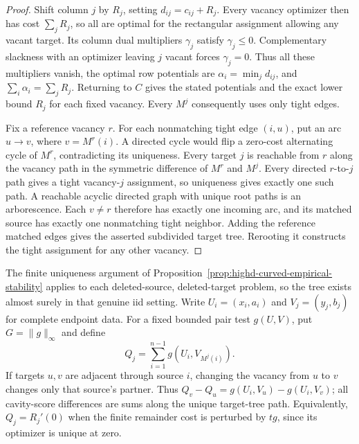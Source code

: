 \documentclass[11pt,reqno]{amsart}
\theoremstyle{definition}
\theoremstyle{remark}
\numberwithin{equation}{section}
\begin{document}
\begin{proof}
Shift column \(j\) by \(R_j\), setting \(d_{ij}=c_{ij}+R_j\).
Every vacancy optimizer then has cost \(\sum_jR_j\), so all are
optimal for the rectangular assignment allowing any vacant target.
Its column dual multipliers \(\gamma_j\) satisfy \(\gamma_j\le0\).
Complementary slackness with an optimizer leaving \(j\) vacant
forces \(\gamma_j=0\). Thus all these multipliers vanish, the
optimal row potentials are \(\alpha_i=\min_jd_{ij}\), and
\(\sum_i\alpha_i=\sum_jR_j\). Returning to \(C\) gives the stated
potentials and the exact lower bound \(R_j\) for each fixed vacancy.
Every \(M^j\) consequently uses only tight edges.

Fix a reference vacancy \(r\). For each nonmatching tight edge
\((i,u)\), put an arc \(u\to v\), where \(v=M^r(i)\).
A directed cycle would flip a zero-cost alternating cycle of
\(M^r\), contradicting its uniqueness. Every target \(j\) is
reachable from \(r\) along the vacancy path in the symmetric
difference of \(M^r\) and \(M^j\). Every directed \(r\)-to-\(j\)
path gives a tight vacancy-\(j\) assignment, so uniqueness gives
exactly one such path. A reachable acyclic directed graph with
unique root paths is an arborescence. Each \(v\ne r\) therefore
has exactly one incoming arc, and its matched source has exactly
one nonmatching tight neighbor. Adding the reference matched edges
gives the asserted subdivided target tree. Rerooting it constructs
the tight assignment for any other vacancy.
\end{proof}

The finite uniqueness argument of
Proposition~\ref{prop:highd-curved-empirical-stability} applies to
each deleted-source, deleted-target problem, so the tree exists
almost surely in that genuine iid setting. Write \(U_i=(x_i,a_i)\)
and \(V_j=(y_j,b_j)\) for complete endpoint data. For a fixed bounded
pair test \(g(U,V)\), put \(G=\|g\|_\infty\) and define
\[
 Q_j=\sum_{i=1}^{n-1}g(U_i,V_{M^j(i)}).
\]
If targets \(u,v\) are adjacent through source \(i\), changing
the vacancy from \(u\) to \(v\) changes only that source's partner.
Thus \(Q_v-Q_u=g(U_i,V_u)-g(U_i,V_v)\); all cavity-score
differences are sums along the unique target-tree path. Equivalently,
\(Q_j=R_j'(0)\) when the finite remainder cost is perturbed by
\(t g\), since its optimizer is unique at zero.
\end{document}
